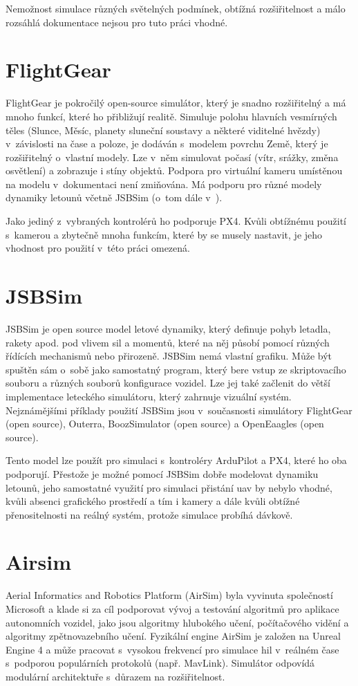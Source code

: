        Nemožnost simulace různých světelných podmínek, obtížná rozšiřitelnost a málo rozsáhlá dokumentace nejsou pro tuto práci vhodné.

    \section{FlightGear} \label{sec:flightgear}
        FlightGear je pokročilý open-source simulátor, který je snadno rozšiřitelný a má mnoho funkcí, které ho přibližují realitě. Simuluje polohu hlavních vesmírných těles (Slunce, Měsíc, planety sluneční soustavy a některé viditelné hvězdy) v~závislosti na čase a poloze, je dodáván s~modelem povrchu Země, který je rozšiřitelný o~vlastní modely. Lze v~něm simulovat počasí (vítr, srážky, změna osvětlení) a zobrazuje i stíny objektů. Podpora pro virtuální kameru umístěnou na modelu v~dokumentaci není zmiňována. Má podporu pro různé modely dynamiky letounů včetně JSBSim (o~tom dále v~). \cite{flightgear}

        Jako jediný z~vybraných kontrolérů ho podporuje PX4. Kvůli obtížnému použití s~kamerou a zbytečně mnoha funkcím, které by se musely nastavit, je jeho vhodnost pro použití v~této práci omezená.

    \section{JSBSim} \label{sec:jsbsim}
        JSBSim je open source model letové dynamiky, který definuje pohyb letadla, rakety apod. pod vlivem sil a momentů, které na něj působí pomocí různých řídících mechanismů nebo přirozeně. JSBSim nemá vlastní grafiku. Může být spuštěn sám o~sobě jako samostatný program, který bere vstup ze skriptovacího souboru a různých souborů konfigurace vozidel. Lze jej také začlenit do větší implementace leteckého simulátoru, který zahrnuje vizuální systém. Nejznámějšími příklady použití JSBSim jsou v~současnosti simulátory FlightGear (open source), Outerra, BoozSimulator (open source) a OpenEaagles (open source). \cite{jsbsim}

        Tento model lze použít pro simulaci s~kontroléry ArduPilot a PX4, které ho oba podporují. Přestože je možné pomocí JSBSim dobře modelovat dynamiku letounů, jeho samostatné využití pro simulaci přistání \acrshort{uav} by nebylo vhodné, kvůli absenci grafického prostředí a tím i kamery a dále kvůli obtížné přenositelnosti na reálný systém, protože simulace probíhá dávkově.

    \section{Airsim} \label{sec:airsim}
        Aerial Informatics and Robotics Platform (AirSim) byla vyvinuta společností Microsoft a klade si za cíl podporovat vývoj a testování algoritmů pro aplikace autonomních vozidel, jako jsou algoritmy hlubokého učení, počítačového vidění a algoritmy zpětnovazebního učení. Fyzikální engine AirSim je založen na Unreal Engine 4 a může pracovat s~vysokou frekvencí pro simulace \acrshort{hil} v~reálném čase s~podporou populárních protokolů (např. MavLink). Simulátor odpovídá modulární architektuře s~důrazem na rozšiřitelnost. \cite{Ebeid2018}

